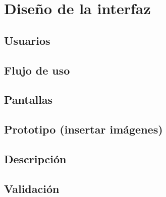\section{Diseño de la interfaz}

\subsection{Usuarios}

\subsection{Flujo de uso}

\subsection{Pantallas}

\subsection{Prototipo (insertar imágenes)}

\subsection{Descripción}

\subsection{Validación}
